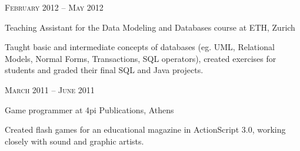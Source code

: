 \documentclass[10pt]{article} %
\begin{document}
\begin{minipage}[t]{0.5\textwidth}
{\raggedleft\textsc{February 2012 -- May 2012}\par}

{\raggedright\large Teaching Assistant for the Data Modeling and Databases course at ETH, Zurich\\}

\normalsize{Taught basic and intermediate concepts of databases (eg. UML, Relational Models, Normal Forms, Transactions, SQL operators), created exercises for students and graded their final SQL and Java projects.}\\


{\raggedleft\textsc{March 2011 -- June 2011}\par}

{\raggedright\large Game programmer at 4pi Publications, Athens\\}

\normalsize{Created flash games for an educational magazine in ActionScript 3.0, working closely with sound and graphic artists.}\\


	

\end{minipage} %
\hfill
\end{document}

